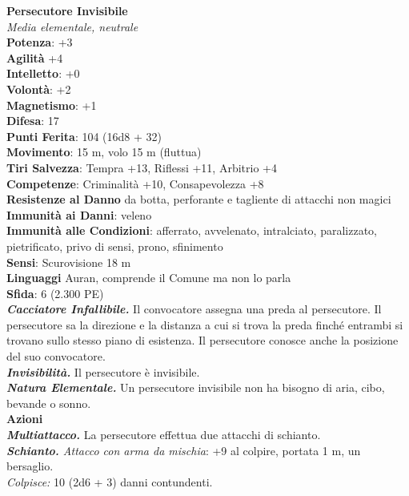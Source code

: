 \begin{multicols}{2}
\medskip\textbf{Persecutore Invisibile}\\
\emph{Media elementale, neutrale}\\
\textbf{Potenza}: +3\\
\textbf{Agilità} +4\\
\textbf{Intelletto}: +0\\
\textbf{Volontà}: +2\\
\textbf{Magnetismo}: +1\\
\textbf{Difesa}: 17\\
\textbf{Punti Ferita}: 104 (16d8 + 32)\\
\textbf{Movimento}: 15 m, volo 15 m (fluttua)\\
\textbf{Tiri Salvezza}: Tempra +13, Riflessi +11, Arbitrio +4\\
\textbf{Competenze}: Criminalità +10, Consapevolezza +8\\
\textbf{Resistenze al Danno} da botta, perforante e tagliente di attacchi non magici\\
\textbf{Immunità ai Danni}: veleno\\
\textbf{Immunità alle Condizioni}: afferrato, avvelenato, intralciato, paralizzato, pietrificato, privo di sensi, prono, sfinimento\\
\textbf{Sensi}: Scurovisione 18 m\\
\textbf{Linguaggi} Auran, comprende il Comune ma non lo parla \\
\textbf{Sfida}: 6 (2.300 PE)\smallskip\\
\emph{\textbf{Cacciatore Infallibile.}} Il convocatore assegna una preda al persecutore. Il persecutore sa la direzione e la distanza a cui si trova la preda finché entrambi si trovano sullo stesso piano di esistenza. Il persecutore conosce anche la posizione del suo convocatore.\\
\emph{\textbf{Invisibilità.}} Il persecutore è invisibile.\\
\emph{\textbf{Natura Elementale.}} Un persecutore invisibile non ha bisogno di aria, cibo, bevande o sonno.\\
\smallskip\textbf{Azioni}\\
\emph{\textbf{Multiattacco.}} La persecutore effettua due attacchi di schianto.\\
\emph{\textbf{Schianto.} Attacco con arma da mischia}: +9 al colpire, portata 1 m, un bersaglio.\\
\emph{Colpisce:} 10 (2d6 + 3) danni contundenti.\\


\end{multicols}
